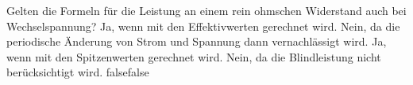     {Gelten die Formeln für die Leistung an einem rein ohmschen Widerstand auch bei Wechselspannung?}
    {Ja, wenn mit den Effektivwerten gerechnet wird.}
    {Nein, da die periodische Änderung von Strom und Spannung dann vernachlässigt wird.}
    {Ja, wenn mit den Spitzenwerten gerechnet wird.}
    {Nein, da die Blindleistung nicht berücksichtigt wird.}
    {false}{false}